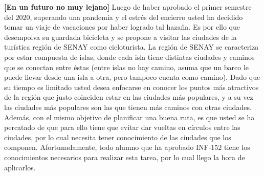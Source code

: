 \documentclass[letterpaper,10pt]{article}
\begin{document}
\textbf{[En un futuro no muy lejano]} Luego de haber aprobado el primer semestre del 2020, superando una pandemia y el estrés del encierro usted ha decidido tomar un viaje de vacaciones por haber logrado tal hazaña. Es por ello que desempolva su guardada bicicleta y se propone a visitar las ciudades de la turística región de SENAY como cicloturista. La región de SENAY se caracteriza por estar compuesta de islas, donde cada isla tiene distintas ciudades y caminos que se conectan entre éstas (entre islas no hay camino, asuma que un barco le puede llevar desde una isla a otra, pero tampoco cuenta como camino). Dado que su tiempo es limitado usted desea enfocarse en conocer los puntos más atractivos de la región que justo coinciden estar en las ciudades más populares, y a su vez las ciudades más populares son las que tienen más caminos con otras ciudades. Además, con el mismo objetivo de planificar una buena ruta, es que usted se ha percatado de que para ello tiene que evitar dar vueltas en círculos entre las ciudades, por lo cual necesita tener conocimiento de las ciudades que los componen. Afortunadamente, todo alumno que ha aprobado INF-152 tiene los conocimientos necesarios para realizar esta tarea, por lo cual llego la hora de aplicarlos.
\end{document}
